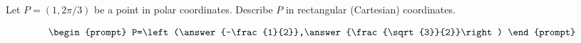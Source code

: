 \documentclass{ximera}
\author{Gregory Hartman \and Matthew Carr}
\begin{document}
\begin{exercise}





Let $P=(1,2\pi/3)$ be a point in polar coordinates. Describe $P$ in rectangular (Cartesian) coordinates.

\[
\begin{prompt}
P=\left(\answer{-\frac{1}{2}},\answer{\frac{\sqrt{3}}{2}}\right)
\end{prompt}
\]

\end{exercise}
\end{document}
